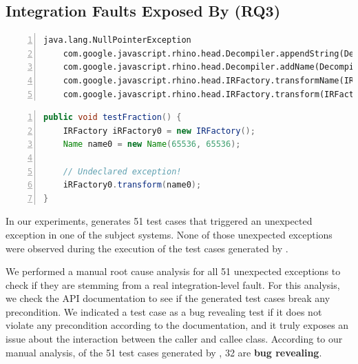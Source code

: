 \subsection{Integration Faults Exposed By \integration (RQ3)}

\begin{lstlisting}[frame=tb,
    caption={Exception captured only by \integration in Closure},
    label=list:divzero,
    captionpos=t,
    numbers=left,
    float=t,
    belowskip=-2.5em,
    firstnumber=1]
    java.lang.NullPointerException
    com.google.javascript.rhino.head.Decompiler.appendString(Decompiler.java:226)
    com.google.javascript.rhino.head.Decompiler.addName(Decompiler.java:156)
    com.google.javascript.rhino.head.IRFactory.transformName(IRFactory.java:833)
    com.google.javascript.rhino.head.IRFactory.transform(IRFactory.java:157)
\end{lstlisting}

\begin{lstlisting}[frame=tb,
    caption={\cling test case triggering the crash in Listing~\ref{list:divzero}},
    label=list:testdivzero,
    language=java,
    captionpos=t,
    numbers=left,
    float=t,
    belowskip=-2.5em,
    firstnumber=1]
public void testFraction() {
    IRFactory iRFactory0 = new IRFactory();
    Name name0 = new Name(65536, 65536);

    // Undeclared exception!
    iRFactory0.transform(name0);
}
\end{lstlisting}

In our experiments, \integration generates 51 test cases that triggered an unexpected exception in one of the subject systems. 
None of those unexpected exceptions were observed during the execution of the test cases generated by \evosuite.

We performed a manual root cause analysis for all 51 unexpected exceptions to check if they are stemming from a real integration-level fault. For this analysis, we check the API documentation to see if the generated test cases break any precondition. We indicated a test case as a bug revealing test if it does not violate any precondition according to the documentation, and it truly exposes an issue about the interaction between the caller and callee class. According to our manual analysis, of the 51 test cases generated by \cling, 32 are \textbf{bug revealing}.

